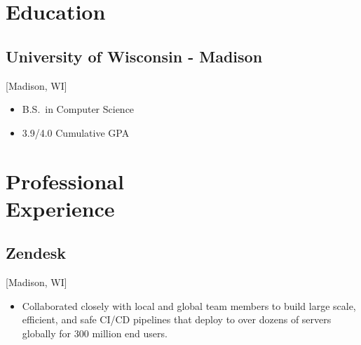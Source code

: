\documentclass{mycv}
\begin{document}
\maketitle
\section{Education}
\subsection{University of Wisconsin - Madison}[Madison, WI]
\vspace{-\parskip}%
\begin{itemize}[label={}]
  \item B.S.\ in Computer Science 
  \item 3.9/4.0 Cumulative GPA
\end{itemize}
\section{Professional \\ Experience}
\subsection{Zendesk}[Madison, WI]
\begin{positions}
\end{positions}
\begin{itemize}
  \item {
     Collaborated closely with local and global team members to build large scale, efficient, and safe CI/CD pipelines that deploy to over dozens of servers globally for 300 million end users.
  }
 \end{itemize}
  
  
\end{document}
